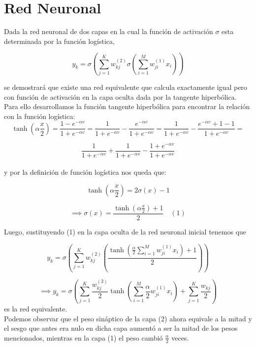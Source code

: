 \documentclass[a4paper]{article}
\theoremstyle{definition}
\theoremstyle{plain}
\begin{document}
\section{Red Neuronal}

Dada la red neuronal de dos capas en la cual la función de activación $\sigma$ esta determinada por la función logística,

$$ y_k = \sigma \left(\sum_{j=1}^{K} w_{kj}^{(2)} \sigma \left( \sum_{i=1}^{M} w_{ji}^{(1)}x_i \right ) \right)$$

se demostrará que existe una red equivalente que calcula exactamente igual pero con función de activación en la capa oculta dada por la tangente hiperbólica.\\


Para ello desarrollamos la función tangente hiperbólica para encontrar la relación con la función logística: 
$$\tanh \left( \alpha \frac{x}{2} \right) =  \frac{1 - e^{- \alpha v}}{1 + e^{- \alpha v}} = \frac{1}{1 + e^{- \alpha v}} - \frac{e^{- \alpha v}}{1 + e^{- \alpha v}} = \frac{1}{1 + e^{- \alpha v}} - \frac{e^{- \alpha v} + 1 - 1}{1 + e^{- \alpha v}} = $$ 

$$\frac{1}{1 + e^{- \alpha v}} + \frac{1}{1 + e^{- \alpha v}} - \frac{1+e^{- \alpha v}}{1 + e^{- \alpha v}} $$\\
y por la definición de función logística nos queda que:

$$\tanh \left( \alpha \frac{x}{2} \right) = 2\sigma(x) - 1 $$

$$ \implies
\sigma(x) = \frac{\tanh \left( \alpha \frac{x}{2} \right) + 1}{2} \quad (1)$$

Luego, sustituyendo (1) en la capa oculta de la red neuronal inicial tenemos que

$$ y_k = \sigma \left(\sum_{j=1}^{K} w_{kj}^{(2)} \left( \frac{\tanh \left( \frac{\alpha}{2} \sum_{i=1}^{M} w_{ji}^{(1)}x_i \right ) + 1}{2}\right) \right)$$

$$ \implies y_k = \sigma \left(\sum_{j=1}^{K} \frac{w_{kj}^{(2)}}{2} \tanh \left( \sum_{i=1}^{M} \frac{\alpha}{2} w_{ji}^{(1)}x_i \right ) + \sum_{j=1}^{K} \frac{w_{kj}}{2}  \right)$$
es la red equivalente.\\

Podemos observar que el peso sináptico de la capa (2) ahora equivale a la mitad y el sesgo que antes era nulo en dicha capa aumentó a ser la mitad de los pesos mencionados, mientras en la capa (1) el peso cambió $\frac{\alpha}{2}$ veces.
\end{document}
